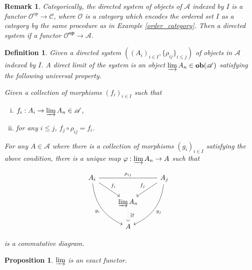 \documentclass{article}
\newtheorem{proposition}{Proposition}[section]
\newtheorem{definition}{Definition}[section]
\newtheorem{remark}{Remark}[section]
\numberwithin{equation}{section}
\begin{document}
\begin{remark}
Categorically, the directed system of objects of $\mathcal{A}$ indexed by $I$ is a functor $\mathcal{O}^{op}\to\mathcal{C}$, where $\mathcal{O}$ is a category which encodes the ordered set $I$ as a category by the same procedure as in Example \ref{order_category}. Then a directed system if a functor $\mathcal{O}^{\mathbf{op}}\to\mathcal{A}$.
\end{remark}

\begin{definition}
Given a directed system $((A_i)_{i\in I},\{\rho_{ij}\}_{i\leq j})$ of objects in $\mathcal{A}$ indexed by $I$. A direct limit of the system is an object $\varinjlim{A_n}\in\mathbf{ob}(\mathcal{A})$ satisfying the following universal property.\\
\par Given a collection of morphisms $(f_i)_{i\in I}$ such that 
\begin{enumerate}[i).]
\item $f_i:A_i\to\varinjlim A_n\in\mathcal{A}$,
\item for any $i\leq j$, $f_j\circ\rho_{ij} = f_i$.
\end{enumerate}
For any $A\in\mathcal{A}$ where there is a collection of morphisms $(g_i)_{i\in I}$ satisfying the above condition, there is a unique map $\varphi:\varinjlim A_n\to A$ such that

\[ 
\begin{tikzcd}
A_i \arrow[rr, "\rho_{ij}", no head] \arrow[rd, "f_i"] \arrow[rdd, swap, "g_i", bend right] &                                               & A_j \arrow[ld, "f_j"'] \arrow[ldd, "g_j", bend left] \\
                                                                                      & \varinjlim A_n \arrow[d, "\exists !", dotted] &                                                      \\
                                                                                      & A                                             &                                                     
\end{tikzcd}
\]

is a commutative diagram.
\end{definition}

\begin{proposition}
\label{direct_limit_exact_functor}
$\varinjlim$ is an exact functor.
\end{proposition}
\end{document}
